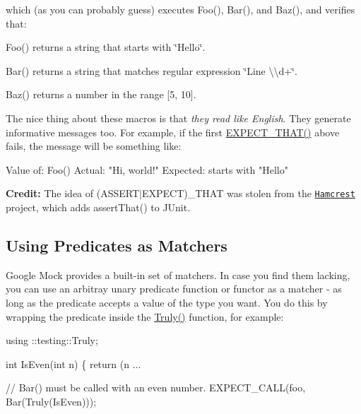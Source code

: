 which (as you can probably guess) executes {\ttfamily Foo()}, {\ttfamily Bar()}, and {\ttfamily Baz()}, and verifies that\+:


\begin{DoxyItemize}
\item {\ttfamily Foo()} returns a string that starts with {\ttfamily \char`\"{}\+Hello\char`\"{}}.
\item {\ttfamily Bar()} returns a string that matches regular expression {\ttfamily \char`\"{}\+Line \textbackslash{}\textbackslash{}d+\char`\"{}}.
\item {\ttfamily Baz()} returns a number in the range \mbox{[}5, 10\mbox{]}.
\end{DoxyItemize}

The nice thing about these macros is that {\itshape they read like English}. They generate informative messages too. For example, if the first {\ttfamily \hyperlink{gmock-matchers_8h_ac31e206123aa702e1152bb2735b31409}{E\+X\+P\+E\+C\+T\+\_\+\+T\+H\+A\+T()}} above fails, the message will be something like\+:


\begin{DoxyCode}
Value of: Foo()
  Actual: "Hi, world!"
Expected: starts with "Hello"
\end{DoxyCode}


{\bfseries Credit\+:} The idea of {\ttfamily (A\+S\+S\+E\+R\+T$\vert$\+E\+X\+P\+E\+CT)\+\_\+\+T\+H\+AT} was stolen from the \href{http://code.google.com/p/hamcrest/}{\tt Hamcrest} project, which adds {\ttfamily assert\+That()} to J\+Unit.

\subsection*{Using Predicates as Matchers}

Google Mock provides a built-\/in set of matchers. In case you find them lacking, you can use an arbitray unary predicate function or functor as a matcher -\/ as long as the predicate accepts a value of the type you want. You do this by wrapping the predicate inside the {\ttfamily \hyperlink{namespacetesting_a5faf05cfaae6074439960048e478b1c8}{Truly()}} function, for example\+:


\begin{DoxyCode}
using ::testing::Truly;

int IsEven(int n) \{ return (n %
...

  // Bar() must be called with an even number.
  EXPECT\_CALL(foo, Bar(Truly(IsEven)));
\end{DoxyCode}


